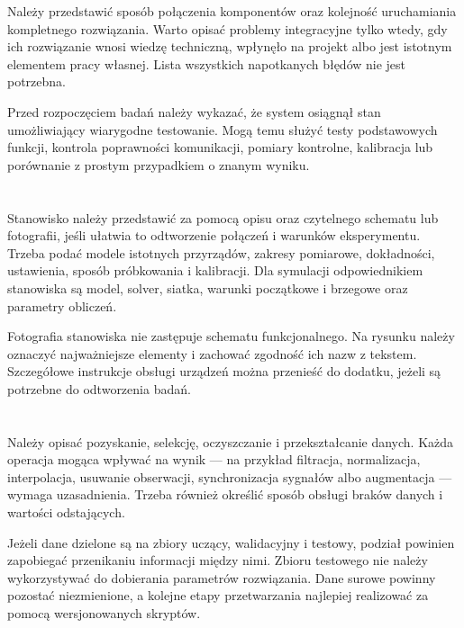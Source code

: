 Należy przedstawić sposób połączenia komponentów oraz kolejność uruchamiania kompletnego rozwiązania. Warto opisać problemy integracyjne tylko wtedy, gdy ich rozwiązanie wnosi wiedzę techniczną, wpłynęło na projekt albo jest istotnym elementem pracy własnej. Lista wszystkich napotkanych błędów nie jest potrzebna.

Przed rozpoczęciem badań należy wykazać, że system osiągnął stan umożliwiający wiarygodne testowanie. Mogą temu służyć testy podstawowych funkcji, kontrola poprawności komunikacji, pomiary kontrolne, kalibracja lub porównanie z prostym przypadkiem o znanym wyniku.

\section{}

Stanowisko należy przedstawić za pomocą opisu oraz czytelnego schematu lub fotografii, jeśli ułatwia to odtworzenie połączeń i warunków eksperymentu. Trzeba podać modele istotnych przyrządów, zakresy pomiarowe, dokładności, ustawienia, sposób próbkowania i kalibracji. Dla symulacji odpowiednikiem stanowiska są model, solver, siatka, warunki początkowe i brzegowe oraz parametry obliczeń.

Fotografia stanowiska nie zastępuje schematu funkcjonalnego. Na rysunku należy oznaczyć najważniejsze elementy i zachować zgodność ich nazw z tekstem. Szczegółowe instrukcje obsługi urządzeń można przenieść do dodatku, jeżeli są potrzebne do odtworzenia badań.

\section{}

Należy opisać pozyskanie, selekcję, oczyszczanie i przekształcanie danych. Każda operacja mogąca wpływać na wynik — na przykład filtracja, normalizacja, interpolacja, usuwanie obserwacji, synchronizacja sygnałów albo augmentacja — wymaga uzasadnienia. Trzeba również określić sposób obsługi braków danych i wartości odstających.

Jeżeli dane dzielone są na zbiory uczący, walidacyjny i testowy, podział powinien zapobiegać przenikaniu informacji między nimi. Zbioru testowego nie należy wykorzystywać do dobierania parametrów rozwiązania. Dane surowe powinny pozostać niezmienione, a kolejne etapy przetwarzania najlepiej realizować za pomocą wersjonowanych skryptów.

